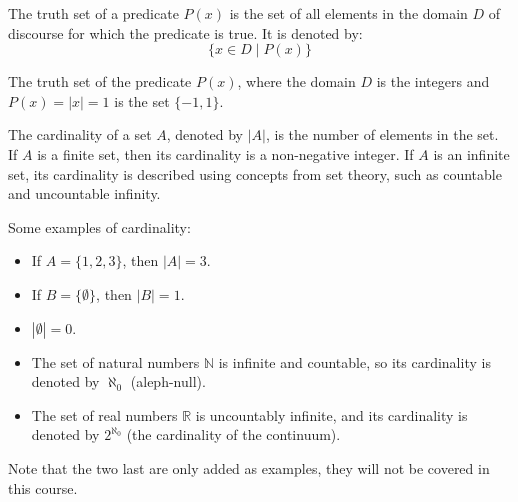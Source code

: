 \begin{definition}
    The truth set of a predicate $P(x)$ is the set of all elements in the domain $D$ of discourse for which the predicate is true. It is denoted by:
    \[ \{x \in D \mid P(x)\} \]
\end{definition}
\begin{eg}
    The truth set of the predicate $P(x)$, where the domain $D$ is the integers and $P(x) = |x| = 1$ is the set $\{-1, 1\}$.
\end{eg}

\begin{definition}
    The cardinality of a set $A$, denoted by $|A|$, is the number of elements in the set. If $A$ is a finite set, then its cardinality is a non-negative integer. If $A$ is an infinite set, its cardinality is described using concepts from set theory, such as countable and uncountable infinity.
\end{definition}
\begin{eg}
    Some examples of cardinality:
    \begin{itemize}[itemsep=1pt,label=$\circ$]
        \item If $A = \{1, 2, 3\}$, then $|A| = 3$.
        \item If $B = \{\emptyset\}$, then $|B| = 1$.
        \item $|\emptyset| = 0$.
        \item The set of natural numbers $\mathbb{N}$ is infinite and countable, so its cardinality is denoted by $\aleph_0$ (aleph-null).
        \item The set of real numbers $\mathbb{R}$ is uncountably infinite, and its cardinality is denoted by $2^{\aleph_0}$ (the cardinality of the continuum).
    \end{itemize}
\end{eg}
Note that the two last are only added as examples, they will not be covered in this course.

